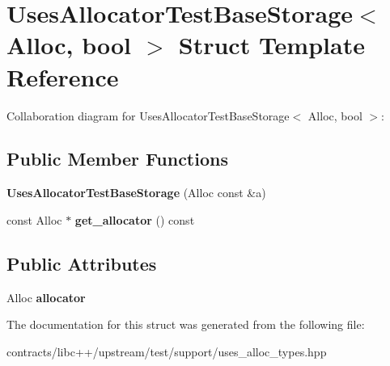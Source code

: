 \hypertarget{struct_uses_allocator_test_base_storage}{}\section{Uses\+Allocator\+Test\+Base\+Storage$<$ Alloc, bool $>$ Struct Template Reference}
\label{struct_uses_allocator_test_base_storage}


Collaboration diagram for Uses\+Allocator\+Test\+Base\+Storage$<$ Alloc, bool $>$\+:
\subsection*{Public Member Functions}
\begin{DoxyCompactItemize}
\item 
\mbox{\label{struct_uses_allocator_test_base_storage_a7c0360ec37c41fbcfcc74daf64301fa4}} 
{\bfseries Uses\+Allocator\+Test\+Base\+Storage} (Alloc const \&a)
\item 
\mbox{\label{struct_uses_allocator_test_base_storage_a0391538ead2110079e41bb94e0052ddb}} 
const Alloc $\ast$ {\bfseries get\+\_\+allocator} () const
\end{DoxyCompactItemize}
\subsection*{Public Attributes}
\begin{DoxyCompactItemize}
\item 
\mbox{\label{struct_uses_allocator_test_base_storage_a8162f2cc4c5c64333dab015db4db760e}} 
Alloc {\bfseries allocator}
\end{DoxyCompactItemize}


The documentation for this struct was generated from the following file\+:\begin{DoxyCompactItemize}
\item 
contracts/libc++/upstream/test/support/uses\+\_\+alloc\+\_\+types.\+hpp\end{DoxyCompactItemize}
